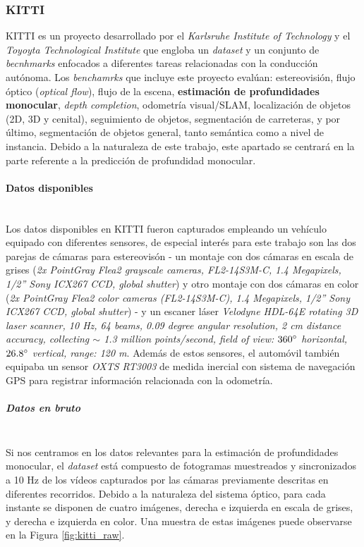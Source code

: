\documentclass[a4paper]{article}
\begin{document}
\subsubsection{KITTI}
KITTI \cite{KITTI-dataset, KITTI-benchmarks, KITTI-road-benchmark, KITTI-sceneflow-benchmark} es un proyecto desarrollado por el \textit{Karlsruhe Institute of Technology} y el \textit{Toyoyta Technological Institute} que engloba un \textit{dataset} y un conjunto de \textit{becnhmarks} enfocados a diferentes tareas relacionadas con la conducción autónoma. Los \textit{benchamrks} que incluye este proyecto evalúan: estereovisión, flujo óptico (\textit{optical flow}), flujo de la escena, \textbf{estimación de profundidades monocular}, \textit{depth completion}, odometría visual/SLAM, localización de objetos (2D, 3D y cenital), seguimiento de objetos, segmentación de carreteras, y por último, segmentación de objetos general, tanto semántica como a nivel de instancia. Debido a la naturaleza de este trabajo, este apartado se centrará en la parte referente a la predicción de profundidad monocular.

\paragraph{Datos disponibles}\mbox{}\\
Los datos disponibles en KITTI fueron capturados empleando un vehículo equipado con diferentes sensores, de especial interés para este trabajo son las dos parejas de cámaras para estereovisón - un montaje con dos cámaras en escala de grises (\textit{2x PointGray Flea2 grayscale cameras, FL2-14S3M-C, 1.4 Megapixels, 1/2” Sony ICX267 CCD, global shutter}) y otro montaje con dos cámaras en color (\textit{2x PointGray Flea2 color cameras (FL2-14S3M-C), 1.4 Megapixels, 1/2” Sony ICX267 CCD, global shutter}) - y un escaner láser \textit{Velodyne HDL-64E rotating 3D laser scanner, 10 Hz, 64 beams, 0.09 degree angular resolution, 2 cm distance accuracy, collecting $\sim$ 1.3 million points/second, field of view: $360\degree$ horizontal, $26.8\degree$ vertical, range: 120 m}. 
Además de estos sensores, el automóvil también equipaba un sensor \textit{OXTS RT3003} de medida inercial con sistema de navegación GPS para registrar información relacionada con la odometría.

\subparagraph{Datos en bruto}\mbox{}\\
Si nos centramos en los datos relevantes para la estimación de profundidades monocular, el \textit{dataset} está compuesto de fotogramas muestreados y sincronizados a 10 Hz de los vídeos capturados por las cámaras previamente descritas en diferentes recorridos. Debido a la naturaleza del sistema óptico, para cada instante se disponen de cuatro imágenes, derecha e izquierda en escala de grises, y derecha e izquierda en color. Una muestra de estas imágenes puede observarse en la Figura \ref{fig:kitti_raw}.
\end{document}
